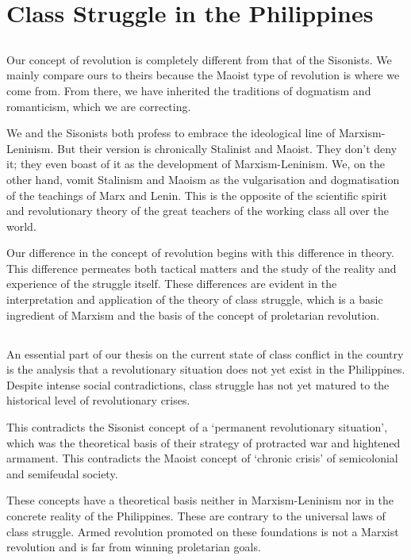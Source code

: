 \chapter{Class Struggle
in the Philippines}
\section{}
Our concept of revolution is completely different from that of the Sisonists. 
We mainly compare ours to theirs 
because the Maoist type of revolution 
is where we come from. 
From there, we have inherited the traditions of dogmatism and romanticism,
which we are correcting.

We and the Sisonists both profess to embrace 
the ideological line of Marxism-Leninism. 
But their version is chronically Stalinist and Maoist. 
They don't deny it;
they even boast of it 
as the development of Marxism-Leninism. 
We, on the other hand, 
vomit Stalinism and Maoism 
as the vulgarisation and dogmatisation of the teachings of Marx and Lenin. 
This is the opposite of the scientific spirit and revolutionary theory 
of the great teachers of the working class all over the world.

Our difference in the concept of revolution 
begins with this difference in theory. 
This difference permeates both tactical matters 
and the study of the reality and experience of the struggle itself. 
These differences are evident 
in the interpretation and application 
of the theory of class struggle,
which is a basic ingredient of Marxism 
and the basis of the concept of proletarian revolution.

\section{}
An essential part of our thesis 
on the current state of class conflict in the country 
is the analysis 
that a revolutionary situation 
does not yet exist in the Philippines. 
Despite intense social contradictions, 
class struggle has not yet matured 
to the historical level of revolutionary crises.

This contradicts the Sisonist concept of a `permanent revolutionary situation', 
which was the theoretical basis of their strategy 
of protracted war and hightened armament. 
This contradicts the Maoist concept of `chronic crisis' 
of semicolonial and semifeudal society.

These concepts have a theoretical basis 
neither in Marxism-Leninism 
nor in the concrete reality of the Philippines. 
These are contrary to the universal laws of class struggle. 
Armed revolution promoted on these foundations
is not a Marxist revolution 
and is far from winning proletarian goals.

